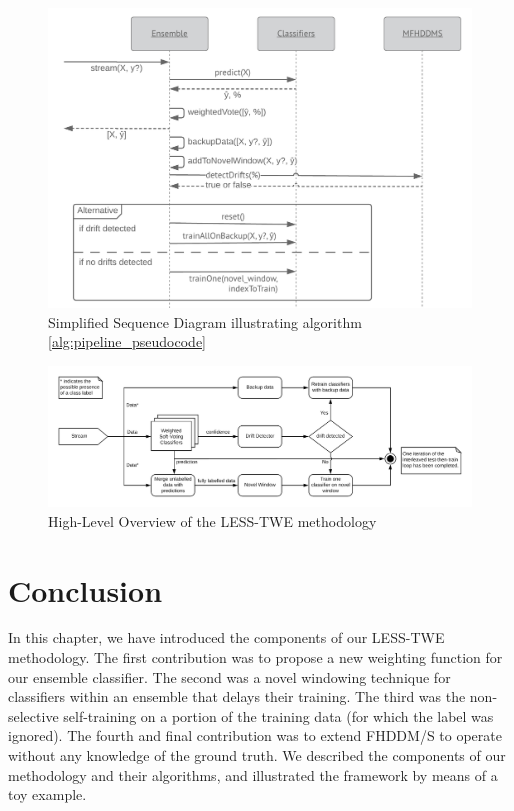 \begin{figure}
  \includegraphics[width=\linewidth]{./images/chapter3/sequence_diagram}
\caption{\label{fig:sequence_diagram}Simplified Sequence Diagram illustrating algorithm \ref{alg:pipeline_pseudocode}}
\end{figure}

\begin{figure}
  \includegraphics[width=\linewidth]{./images/chapter3/prequential_loop}
\caption{\label{fig:prequential_loop}High-Level Overview of the LESS-TWE methodology}
\end{figure}


\section{Conclusion}
In this chapter, we have introduced the components of our LESS-TWE methodology. The first contribution was to propose a new weighting function for our ensemble classifier. The second was a novel windowing technique for classifiers within an ensemble that delays their training. The third was the non-selective self-training on a portion of the training data (for which the label was ignored). The fourth and final contribution was to extend FHDDM/S to operate without any knowledge of the ground truth. We described the components of our methodology and their algorithms, and illustrated the framework by means of a toy example.